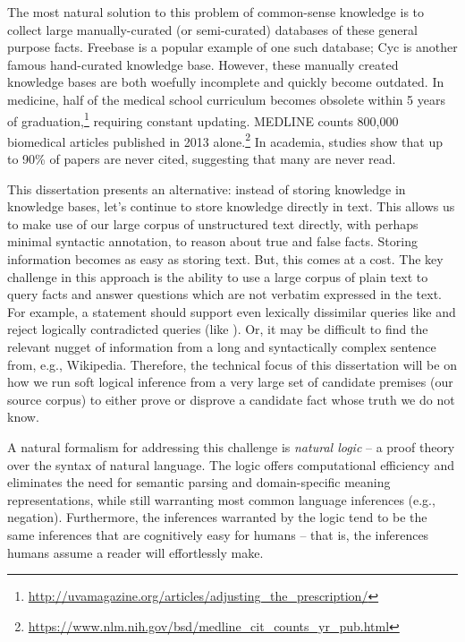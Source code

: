 The most natural solution to this problem of common-sense knowledge is to collect large 
  manually-curated (or semi-curated) databases of these general purpose facts.
Freebase \cite{key:2008bollacker-freebase} is a popular example of one
  such database; Cyc \cite{key:1995lenat-cyc} is another famous hand-curated
  knowledge base.
However, these manually created knowledge bases are both woefully incomplete 
  and quickly become outdated.
In medicine, half of the medical school curriculum becomes obsolete within 5 
  years of graduation,\footnote{
    \url{http://uvamagazine.org/articles/adjusting\_the\_prescription/}
  }
  requiring constant updating.
  MEDLINE counts 800,000 biomedical articles published in 2013 alone.\footnote{
    \url{https://www.nlm.nih.gov/bsd/medline\_cit\_counts\_yr\_pub.html}
  }
In academia, studies show that up to 90\% of papers are never 
  cited, suggesting that many are never read.

This dissertation presents an alternative:
  instead of storing knowledge in knowledge bases, let's continue to store knowledge
  directly in text.
This allows us to make use of our large corpus of unstructured text directly, with
  perhaps minimal syntactic annotation, to reason about true and false facts.
Storing information becomes as easy as storing text.
But, this comes at a cost.
The key challenge in this approach is the ability to use a large 
  corpus of plain text to query facts and answer questions which are not verbatim 
  expressed in the text.
For example, a statement  should support even lexically 
  dissimilar queries like  and reject logically 
  contradicted queries (like ).
Or, it may be difficult to find the relevant nugget of information from a long and syntactically
  complex sentence from, e.g., Wikipedia.
Therefore, the technical focus of this dissertation will be on how we run soft logical
  inference from a very large set of candidate premises (our source corpus) to either
  prove or disprove a candidate fact whose truth we do not know.

A natural formalism for addressing this challenge is \textit{natural logic} -- a proof 
  theory over the syntax of natural language.
The logic offers computational efficiency and eliminates the need for semantic 
  parsing and domain-specific meaning representations, while still warranting most 
  common language inferences (e.g., negation). 
Furthermore, the inferences warranted by the logic tend to be 
  the same inferences that are cognitively easy for humans -- that is, 
  the inferences humans assume a reader will effortlessly make.


